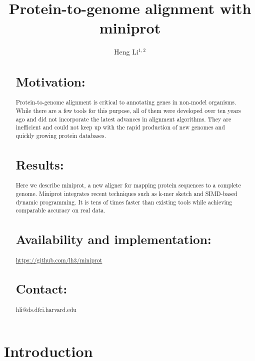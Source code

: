 \documentclass{bioinfo}
\begin{document}

\title[Aligning proteins to genomes with miniprot]{Protein-to-genome alignment with miniprot}
\author[Li]{Heng Li$^{1,2}$}
\address{$^1$Dana-Farber Cancer Institute, 450 Brookline Ave, Boston, MA 02215, USA,
$^2$Harvard Medical School, 10 Shattuck St, Boston, MA 02215, USA}

\maketitle

\begin{abstract}

\section{Motivation:} Protein-to-genome alignment is critical to annotating
genes in non-model organisms. While there are a few tools for this purpose, all
of them were developed over ten years ago and did not incorporate the latest
advances in alignment algorithms. They are inefficient and could not keep up
with the rapid production of new genomes and quickly growing protein databases.

\section{Results:} Here we describe miniprot, a new aligner for mapping
protein sequences to a complete genome. Miniprot integrates recent techniques
such as k-mer sketch and SIMD-based dynamic programming. It is tens of times
faster than existing tools while achieving comparable accuracy on real data.

\section{Availability and implementation:}
\href{https://github.com/lh3/miniprot}{https://github.com/lh3/miniprot}

\section{Contact:} hli@ds.dfci.harvard.edu
\end{abstract}

\section{Introduction}
\end{document}
